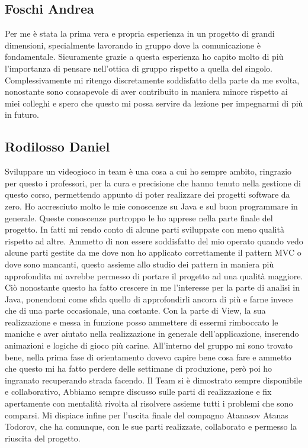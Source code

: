 \documentclass[a4paper,12pt]{report}
\begin{document}
\subsection{Foschi Andrea}
Per me è stata la prima vera e propria esperienza in un progetto di grandi dimensioni, specialmente lavorando in gruppo dove la comunicazione è fondamentale. Sicuramente grazie a questa esperienza ho capito molto di più l’importanza di pensare nell’ottica di gruppo rispetto a quella del singolo. Complessivamente mi ritengo discretamente soddisfatto della parte da me svolta, nonostante sono consapevole di aver contribuito in maniera minore rispetto ai miei colleghi e spero che questo mi possa servire da lezione per impegnarmi di più in futuro.

\subsection{Rodilosso Daniel}
Sviluppare un videogioco in team è una cosa a cui ho sempre ambito, ringrazio per questo i professori, per la cura e precisione che 
hanno tenuto nella gestione di questo corso, permettendo appunto di poter realizzare dei progetti software da zero.
Ho accresciuto molto le mie conoscenze su Java e sul buon programmare in generale.
Queste conoscenze purtroppo le ho apprese nella parte finale del progetto.
In fatti mi rendo conto di alcune parti sviluppate con meno qualità rispetto ad altre.
Ammetto di non essere soddisfatto del mio operato quando vedo alcune parti gestite da me dove non ho applicato correttamente il pattern MVC o dove sono mancanti, questo assieme allo studio dei pattern in maniera più approfondita mi avrebbe permesso di portare il progetto ad una 
qualità maggiore. Ciò nonostante questo ha fatto crescere in me l’interesse per la parte di analisi in Java, ponendomi come sfida quello di approfondirli ancora 
di più e farne invece che di una parte occasionale, una costante.
Con la parte di View, la sua realizzazione e messa in funzione posso ammettere di essermi rimboccato le maniche e aver aiutato nella 
realizzazione in generale dell’applicazione, inserendo animazioni e logiche di gioco più carine. 
All’interno del gruppo mi sono trovato bene, nella prima fase di orientamento dovevo capire bene cosa fare e ammetto che questo mi ha fatto perdere delle settimane di produzione, però poi ho ingranato recuperando strada facendo. Il Team si è dimostrato sempre disponibile e collaborativo,
Abbiamo sempre discusso sulle parti di realizzazione e fix apertamente con mentalità rivolta al risolvere assieme tutti i problemi che sono comparsi. Mi dispiace infine per l’uscita finale del compagno Atanasov Atanas Todorov, che ha comunque, con le sue parti realizzate, collaborato e permesso la riuscita del progetto.
\end{document}
